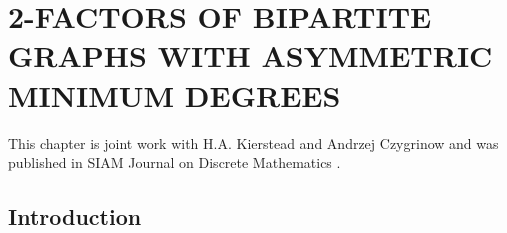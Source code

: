 \documentclass[oneside,12pt]{memoir}
\newtheorem{corollary}[theorem]{Corollary}
\newcommand{\ep}{\epsilon}
\begin{document}
% 
% 
% 
% 





\chapter{2-FACTORS OF BIPARTITE GRAPHS WITH ASYMMETRIC MINIMUM DEGREES}\label{2factorschapter}

\DoubleSpacing
\setlength{\parindent}{.5in}

This chapter is joint work with H.A. Kierstead and Andrzej Czygrinow and was published in SIAM Journal on Discrete Mathematics \cite{CDK}.


\section{Introduction}
\end{document}
